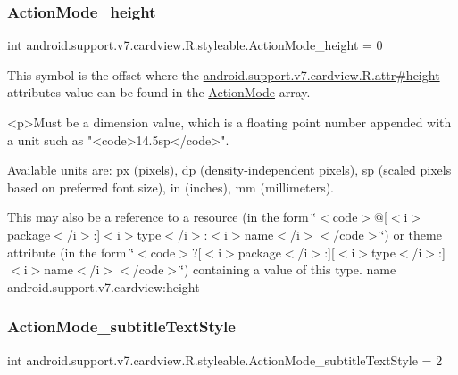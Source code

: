 \subsubsection{\texorpdfstring{Action\+Mode\+\_\+height}{ActionMode\_height}}
{\footnotesize\ttfamily int android.\+support.\+v7.\+cardview.\+R.\+styleable.\+Action\+Mode\+\_\+height = 0\hspace{0.3cm}{\ttfamily [static]}}

This symbol is the offset where the \hyperlink{classandroid_1_1support_1_1v7_1_1cardview_1_1R_1_1attr_a52501b26bd9a1de11fdf451397cb630c}{android.\+support.\+v7.\+cardview.\+R.\+attr\#height} attribute\textquotesingle{}s value can be found in the \hyperlink{classandroid_1_1support_1_1v7_1_1cardview_1_1R_1_1styleable_aadab2db6f0b961c9bad3b28abb49a9b0}{Action\+Mode} array.

\begin{DoxyVerb}      <p>Must be a dimension value, which is a floating point number appended with a unit such as "<code>14.5sp</code>".
\end{DoxyVerb}
 Available units are\+: px (pixels), dp (density-\/independent pixels), sp (scaled pixels based on preferred font size), in (inches), mm (millimeters). 

This may also be a reference to a resource (in the form \char`\"{}$<$code$>$@\mbox{[}$<$i$>$package$<$/i$>$\+:\mbox{]}$<$i$>$type$<$/i$>$\+:$<$i$>$name$<$/i$>$$<$/code$>$\char`\"{}) or theme attribute (in the form \char`\"{}$<$code$>$?\mbox{[}$<$i$>$package$<$/i$>$\+:\mbox{]}\mbox{[}$<$i$>$type$<$/i$>$\+:\mbox{]}$<$i$>$name$<$/i$>$$<$/code$>$\char`\"{}) containing a value of this type.  name android.\+support.\+v7.\+cardview\+:height \mbox{\label{classandroid_1_1support_1_1v7_1_1cardview_1_1R_1_1styleable_a4e31cf5933cdeb00f2f52de225b74ceb}} 
\subsubsection{\texorpdfstring{Action\+Mode\+\_\+subtitle\+Text\+Style}{ActionMode\_subtitleTextStyle}}
{\footnotesize\ttfamily int android.\+support.\+v7.\+cardview.\+R.\+styleable.\+Action\+Mode\+\_\+subtitle\+Text\+Style = 2\hspace{0.3cm}{\ttfamily [static]}}

